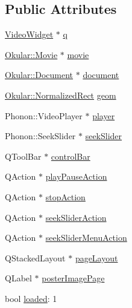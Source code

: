 \subsection*{Public Attributes}
\begin{DoxyCompactItemize}
\item 
\hyperlink{classVideoWidget}{Video\+Widget} $\ast$ \hyperlink{classVideoWidget_1_1Private_ac4360af14b1cdb4912d507cbb3a941a8}{q}
\item 
\hyperlink{classOkular_1_1Movie}{Okular\+::\+Movie} $\ast$ \hyperlink{classVideoWidget_1_1Private_a500f2a0b237f083a573b689a1bb0a90a}{movie}
\item 
\hyperlink{classOkular_1_1Document}{Okular\+::\+Document} $\ast$ \hyperlink{classVideoWidget_1_1Private_a895eab69b0a523e279dafe00bb9f208c}{document}
\item 
\hyperlink{classOkular_1_1NormalizedRect}{Okular\+::\+Normalized\+Rect} \hyperlink{classVideoWidget_1_1Private_a11423c5cfafc4c6a7b573b9c4e010a4b}{geom}
\item 
Phonon\+::\+Video\+Player $\ast$ \hyperlink{classVideoWidget_1_1Private_ad25b2b9ba312490e52b2c21861aceaa1}{player}
\item 
Phonon\+::\+Seek\+Slider $\ast$ \hyperlink{classVideoWidget_1_1Private_a70e31cd6bc6216e372c80b62684f2dcf}{seek\+Slider}
\item 
Q\+Tool\+Bar $\ast$ \hyperlink{classVideoWidget_1_1Private_a1b6973ec2db407feeaaa362f436440f5}{control\+Bar}
\item 
Q\+Action $\ast$ \hyperlink{classVideoWidget_1_1Private_a573e20300c27f08b5d9f4bcff46d21ce}{play\+Pause\+Action}
\item 
Q\+Action $\ast$ \hyperlink{classVideoWidget_1_1Private_a1c5aa30fc3d0f10c2cb4f4f76eca14db}{stop\+Action}
\item 
Q\+Action $\ast$ \hyperlink{classVideoWidget_1_1Private_ac16af65e0f9a05a84c853a2402c1ce26}{seek\+Slider\+Action}
\item 
Q\+Action $\ast$ \hyperlink{classVideoWidget_1_1Private_a638e1c16fe06792667af9d7296d7cc5e}{seek\+Slider\+Menu\+Action}
\item 
Q\+Stacked\+Layout $\ast$ \hyperlink{classVideoWidget_1_1Private_afcb2f757498947705dafb8305e0fb0bc}{page\+Layout}
\item 
Q\+Label $\ast$ \hyperlink{classVideoWidget_1_1Private_a68a1e9357ce7c092b82ae61860d68ed3}{poster\+Image\+Page}
\item 
bool \hyperlink{classVideoWidget_1_1Private_a56cd47cb3f67303c324c1141de5f8068}{loaded}\+: 1
\end{DoxyCompactItemize}


